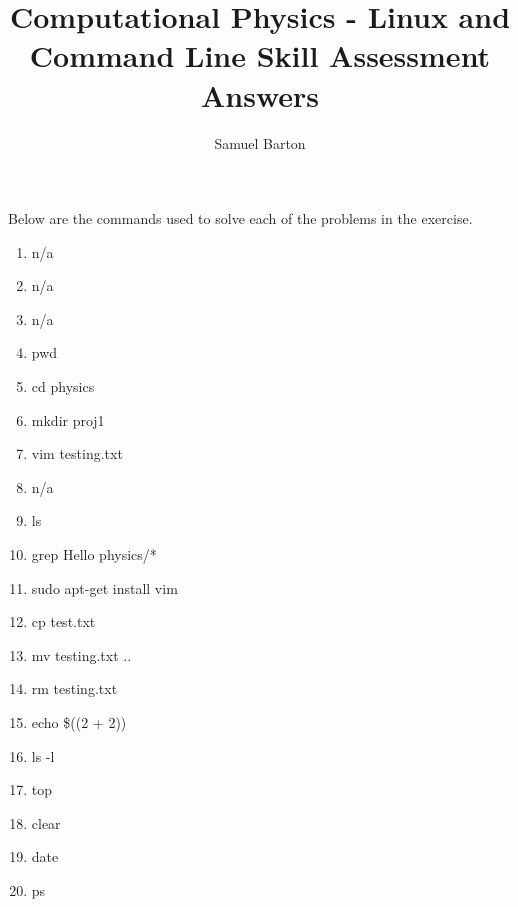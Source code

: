 \documentclass{article}
\title{Computational Physics - Linux and Command Line Skill Assessment Answers}
\author {Samuel Barton}
\begin{document}
	
	\maketitle
	
Below are the commands used to solve each of the problems in the exercise.
	
	\begin{enumerate}
		\item n/a
		\item n/a
		\item n/a
		\item pwd
		\item cd physics
		\item mkdir proj1
		\item vim testing.txt
		\item n/a
		\item ls
		\item grep Hello physics/*
		\item sudo apt-get install vim
		\item cp test.txt ~
		\item mv testing.txt ..
		\item rm testing.txt
		\item echo \$((2 + 2))
		\item ls -l
		\item top
		\item clear
		\item date
		\item ps
	\end{enumerate}
\end{document}
